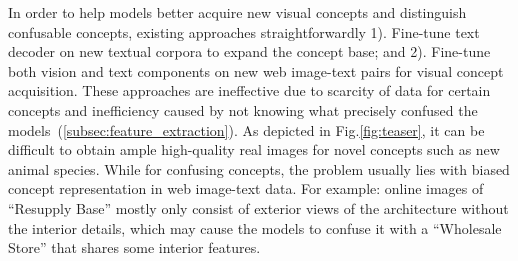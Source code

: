 In order to help models better acquire new visual concepts and distinguish confusable concepts, 
existing approaches straightforwardly 1). Fine-tune text decoder on new textual corpora to expand the concept base; and 2). Fine-tune both vision and text components on new web image-text pairs for visual concept acquisition.
These approaches are ineffective due to scarcity of data for certain concepts and inefficiency caused by not knowing what precisely confused the models~(\ref{subsec:feature_extraction}).
As depicted in Fig.\ref{fig:teaser}, it can be difficult to obtain ample high-quality real images for novel concepts such as new animal species.
While for confusing concepts, the problem usually lies with biased concept representation in web image-text data. For example: online images of ``Resupply Base'' mostly only consist of exterior views of the architecture without the interior details, which may cause the models to confuse it with a ``Wholesale Store'' that shares some interior features. %








